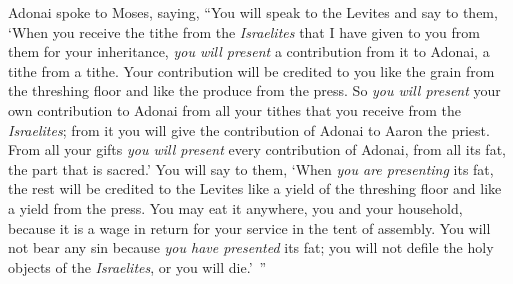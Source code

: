 \begin{biblechapter}
\verse Adonai spoke to Moses, saying,
\verse “You will speak to the Levites and say to them, ‘When you receive the tithe from the \textit{Israelites} that I have given to you from them for your inheritance, \textit{you will present} a contribution from it to Adonai, a tithe from a tithe.
\verse Your contribution will be credited to you like the grain from the threshing floor and like the produce from the press.
\verse So \textit{you will present} your own contribution to Adonai from all your tithes that you receive from the \textit{Israelites}; from it you will give the contribution of Adonai to Aaron the priest.
\verse From all your gifts \textit{you will present} every contribution of Adonai, from all its fat, the part that is sacred.’
\verse You will say to them, ‘When \textit{you are presenting} its fat, the rest will be credited to the Levites like a yield of the threshing floor and like a yield from the press.
\verse You may eat it anywhere, you and your household, because it is a wage in return for your service in the tent of assembly.
\verse You will not bear any sin because \textit{you have presented} its fat; you will not defile the holy objects of the \textit{Israelites}, or you will die.’ ”
\end{biblechapter}

